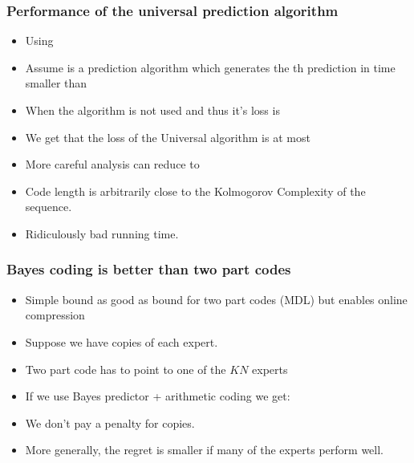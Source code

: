 \documentclass{beamer}
\begin{document}
\begin{frame}
\frametitle{Performance of the universal prediction algorithm}
\begin{itemize}
\item Using 
\item Assume  is a prediction algorithm which generates the 
th prediction in time smaller than 
\item When  the algorithm is not used and thus it's loss is 
\item We get that the loss of the Universal algorithm is at most 
\item More careful analysis can reduce  to 
\item Code length is arbitrarily close to the Kolmogorov Complexity of the sequence.
\item Ridiculously bad running time.
\end{itemize}
\end{frame}

\begin{frame}
\frametitle{Bayes coding is better than two part codes}
\begin{itemize}
\item
Simple bound as good as bound for two part codes (MDL) 
but enables online compression
\item Suppose we have  copies of each expert.
\item Two part code has to point to one of the $KN$ experts
\item If we use Bayes predictor + arithmetic coding we get:
\item We don't pay a penalty for copies.
\item More generally, the regret is smaller if many of the experts perform well.
\end{itemize}
\end{frame}
\end{document}
